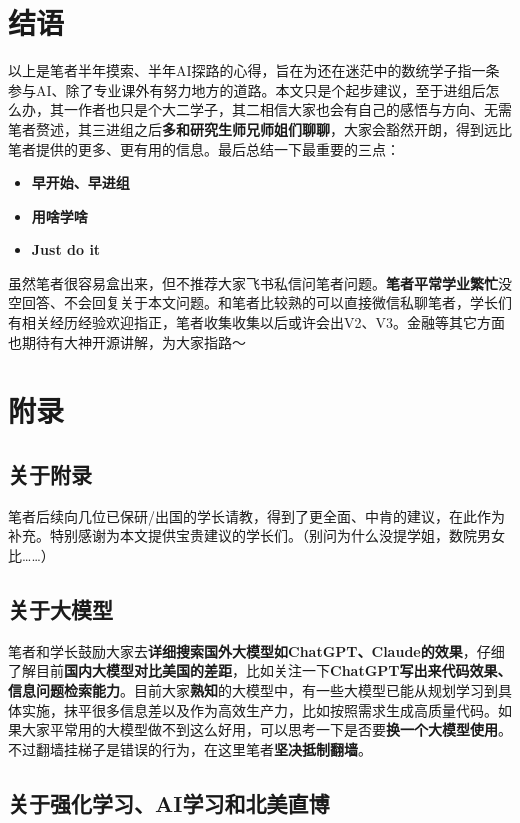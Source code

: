 \documentclass[12pt, a4paper, fontset=ubuntu]{ctexart}
\begin{document}
{\section{结语}
以上是笔者半年摸索、半年AI探路的心得，旨在为还在迷茫中的数统学子指一条参与AI、除了专业课外有努力地方的道路。本文只是个起步建议，至于进组后怎么办，其一作者也只是个大二学子，其二相信大家也会有自己的感悟与方向、无需笔者赘述，其三进组之后\textbf{多和研究生师兄师姐们聊聊}，大家会豁然开朗，得到远比笔者提供的更多、更有用的信息。最后总结一下最重要的三点：
\begin{itemize}
    \item \textbf{早开始、早进组}
    \item \textbf{用啥学啥}
    \item \textbf{Just do it}
\end{itemize}
\par 虽然笔者很容易盒出来，但不推荐大家飞书私信问笔者问题。\textbf{笔者平常学业繁忙}没空回答、不会回复关于本文问题。和笔者比较熟的可以直接微信私聊笔者，学长们有相关经历经验欢迎指正，笔者收集收集以后或许会出V2、V3。金融等其它方面也期待有大神开源讲解，为大家指路～
\section{附录}
\subsection{关于附录}
笔者后续向几位已保研/出国的学长请教，得到了更全面、中肯的建议，在此作为补充。特别感谢为本文提供宝贵建议的学长们。（别问为什么没提学姐，数院男女比……）
\subsection{关于大模型}
笔者和学长鼓励大家去\textbf{详细搜索国外大模型如ChatGPT、Claude的效果}，仔细了解目前\textbf{国内大模型对比美国的差距}，比如关注一下\textbf{ChatGPT写出来代码效果、信息问题检索能力}。目前大家\textbf{熟知}的大模型中，有一些大模型已能从规划学习到具体实施，抹平很多信息差以及作为高效生产力，比如按照需求生成高质量代码。如果大家平常用的大模型做不到这么好用，可以思考一下是否要\textbf{换一个大模型使用}。不过翻墙挂梯子是错误的行为，在这里笔者\textbf{坚决抵制翻墙}。
\subsection{关于强化学习、AI学习和北美直博}
}
\end{document}
